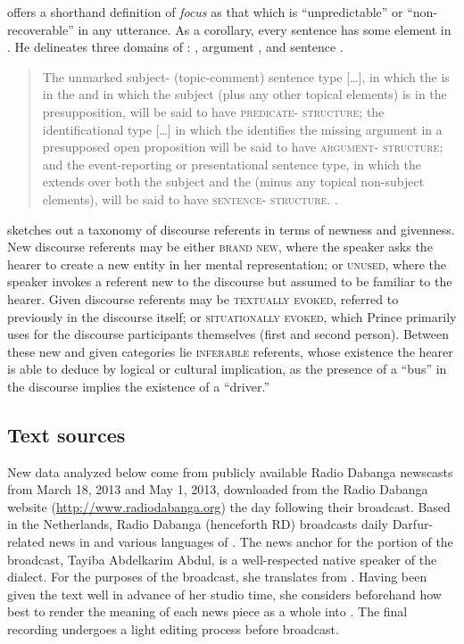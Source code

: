 \documentclass[output=paper,modfonts]{langscibook}
\begin{document}
\citet[211]{Lambrecht1994} offers a shorthand definition of \textit{focus} as that which is “unpredictable” or “non-recoverable” in any utterance. As a corollary, every sentence has some element in . He delineates three domains of :  , argument , and sentence .

\begin{quote}
The unmarked subject- (topic-comment) sentence type […], in which the  is in the  and in which the subject (plus any other topical elements) is in the presupposition, will be said to have \textsc{predicate- structure}; the identificational type […] in which the  identifies the missing argument in a presupposed open proposition will be said to have \textsc{argument- structure}; and the event-reporting or presentational sentence type, in which the  extends over both the subject and the  (minus any topical non-subject elements), will be said to have \textsc{sentence- structure}. \citep[222]{Lambrecht1994}.
\end{quote}

\citet{Prince1981} sketches out a taxonomy of discourse referents in terms of newness and givenness. New discourse referents may be either \textsc{brand new}, where the speaker asks the hearer to create a new entity in her mental representation; or \textsc{unused}, where the speaker invokes a referent new to the discourse but assumed to be familiar to the hearer. Given discourse referents may be \textsc{textually evoked}, referred to previously in the discourse itself; or \textsc{situationally evoked}, which Prince primarily uses for the discourse participants themselves (first and second person). Between these new and given categories lie \textsc{inferable} referents, whose existence the hearer is able to deduce by logical or cultural implication, as the presence of a “bus” in the discourse implies the existence of a “driver.”


\subsection{Text sources}\label{sec:wolfe:2.2}
New data analyzed below come from publicly available Radio Dabanga newscasts from March 18, 2013 and May 1, 2013, downloaded from the Radio Dabanga website (\url{http://www.radiodabanga.org}) the day following their broadcast. Based in the Netherlands, Radio Dabanga (henceforth RD) broadcasts daily Darfur-related news in  and various languages of . The news anchor for the  portion of the broadcast, Tayiba Abdelkarim Abdul, is a well-respected native speaker of the  dialect. For the purposes of the broadcast, she translates from . Having been given the text well in advance of her studio time, she considers beforehand how best to render the meaning of each news piece as a whole into . The final recording undergoes a light editing process before broadcast. 
\end{document}
